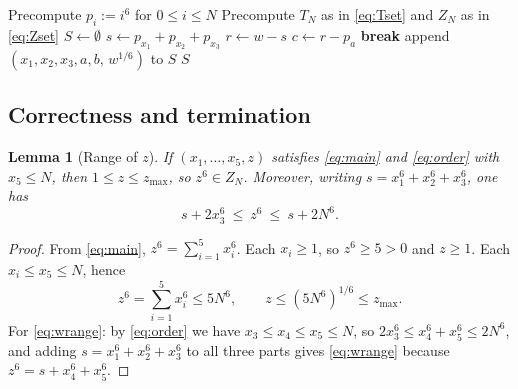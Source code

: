 \documentclass{amsart}
\newtheorem{lemma}{Lemma}
\begin{document}
\begin{algorithm}[h]
\caption{Exhaustive search for solutions of \eqref{eq:main} with $\max_i x_i\le N$}
\label{alg:search}
\begin{algorithmic}[1]
\State Precompute $p_i:=i^6$ for $0\le i\le N$
\State Precompute $T_N$ as in \eqref{eq:Tset} and $Z_N$ as in \eqref{eq:Zset}
\State $S\gets\emptyset$
      \State $s\gets p_{x_1}+p_{x_2}+p_{x_3}$
        \State $r\gets w-s$ 
            \State $c\gets r-p_a$
             \textbf{break} 
            \EndIf
              \State append $(x_1,x_2,x_3,a,b,\,w^{1/6})$ to $S$
            \EndIf
          \EndFor
        \EndIf
      \EndFor
    \EndFor
  \EndFor
\EndFor
\State \Return $S$
\end{algorithmic}
\end{algorithm}

\subsection*{Correctness and termination}

\begin{lemma}[Range of $z$]\label{lem:zrange}
If $(x_1,\dots,x_5,z)$ satisfies \eqref{eq:main} and \eqref{eq:order}
with $x_5\le N$, then $1\le z\le z_{\max}$, so $z^6\in Z_N$. Moreover,
writing $s=x_1^6+x_2^6+x_3^6$, one has
\begin{equation}\label{eq:wrange}
s+2x_3^6\ \le\ z^6\ \le\ s+2N^6 .
\end{equation}
\end{lemma}

\begin{proof}
From \eqref{eq:main}, $z^6=\sum_{i=1}^5 x_i^6$. Each $x_i\ge 1$, so
$z^6\ge 5>0$ and $z\ge 1$. Each $x_i\le x_5\le N$, hence
\begin{equation}\label{eq:Zbound}
z^6=\sum_{i=1}^5 x_i^6\le 5N^6,\qquad
z\le (5N^6)^{1/6}\le z_{\max}.
\end{equation}
For \eqref{eq:wrange}: by \eqref{eq:order} we have
$x_3\le x_4\le x_5\le N$, so
$2x_3^6\le x_4^6+x_5^6\le 2N^6$, and adding $s=x_1^6+x_2^6+x_3^6$ to all
three parts gives \eqref{eq:wrange} because
$z^6=s+x_4^6+x_5^6$.
\end{proof}
\end{document}
